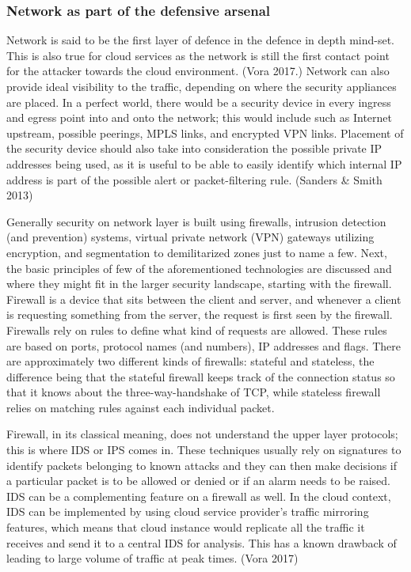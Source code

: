 \documentclass{article}
\begin{document}
\subsubsection{Network as part of the defensive arsenal}
Network is said to be the first layer of defence in the defence in depth mind-set. This is also true for cloud services as the network is still the first contact point for the attacker towards the cloud environment. (Vora 2017.)
Network can also provide ideal visibility to the traffic, depending on where the security appliances are placed. In a perfect world, there would be a security device in every ingress and egress point into and onto the network; this would include such as Internet upstream, possible peerings, MPLS links, and encrypted VPN links. Placement of the security device should also take into consideration the possible private IP addresses being used, as it is useful to be able to easily identify which internal IP address is part of the possible alert or packet-filtering rule. (Sanders \& Smith 2013)
\par
Generally security on network layer is built using firewalls, intrusion detection (and prevention) systems, virtual private network (VPN) gateways utilizing encryption, and segmentation to demilitarized zones just to name a few. Next, the basic principles of few of the aforementioned technologies are discussed and where they might fit in the larger security landscape, starting with the firewall. Firewall is a device that sits between the client and server, and whenever a client is requesting something from the server, the request is first seen by the firewall. Firewalls rely on rules to define what kind of requests are allowed. These rules are based on ports, protocol names (and numbers), IP addresses and flags. There are approximately two different kinds of firewalls: stateful and stateless, the difference being that the stateful firewall keeps track of the connection status so that it knows about the three-way-handshake of TCP, while stateless firewall relies on matching rules against each individual packet.
\par
Firewall, in its classical meaning, does not understand the upper layer protocols; this is where IDS or IPS comes in. These techniques usually rely on signatures to identify packets belonging to known attacks and they can then make decisions if a particular packet is to be allowed or denied or if an alarm needs to be raised. IDS can be a complementing feature on a firewall as well. In the cloud context, IDS can be implemented by using cloud service provider's traffic mirroring features, which means that cloud instance would replicate all the traffic it receives and send it to a central IDS for analysis. This has a known drawback of leading to large volume of traffic at peak times. (Vora 2017)
\end{document}
